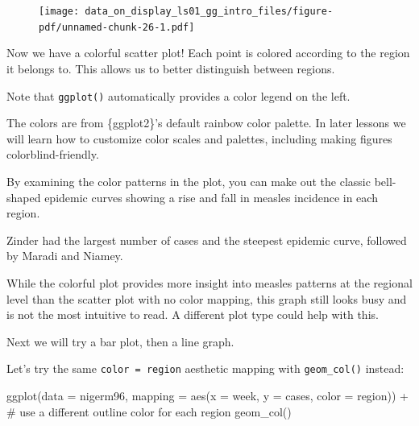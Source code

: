 \documentclass[
  letterpaper,
  DIV=11,
  numbers=noendperiod]{scrreprt}
\newenvironment{Shaded}{\begin{snugshade}}{\end{snugshade}}
\newcommand{\AttributeTok}[1]{\textcolor[rgb]{0.40,0.45,0.13}{#1}}
\newcommand{\CommentTok}[1]{\textcolor[rgb]{0.37,0.37,0.37}{#1}}
\newcommand{\FunctionTok}[1]{\textcolor[rgb]{0.28,0.35,0.67}{#1}}
\newcommand{\NormalTok}[1]{\textcolor[rgb]{0.00,0.23,0.31}{#1}}
\newcommand{\SpecialCharTok}[1]{\textcolor[rgb]{0.37,0.37,0.37}{#1}}
\begin{document}
\begin{figure}[H]

{\centering \texttt{[image: data\_on\_display\_ls01\_gg\_intro\_files/figure-pdf/unnamed-chunk-26-1.pdf]}

}

\end{figure}

Now we have a colorful scatter plot! Each point is colored according to
the region it belongs to. This allows us to better distinguish between
regions.

Note that \texttt{ggplot()} automatically provides a color legend on the
left.

\begin{tcolorbox}[enhanced jigsaw, colframe=quarto-callout-note-color-frame, rightrule=.15mm, opacityback=0, breakable, coltitle=black, colbacktitle=quarto-callout-note-color!10!white, bottomrule=.15mm, leftrule=.75mm, toprule=.15mm, arc=.35mm, bottomtitle=1mm, colback=white, left=2mm, opacitybacktitle=0.6, titlerule=0mm, title=\textcolor{quarto-callout-note-color}{\faInfo}\hspace{0.5em}{Side Note}, toptitle=1mm]

The colors are from \{ggplot2\}'s default rainbow color palette. In
later lessons we will learn how to customize color scales and palettes,
including making figures colorblind-friendly.

\end{tcolorbox}

By examining the color patterns in the plot, you can make out the
classic bell-shaped epidemic curves showing a rise and fall in measles
incidence in each region.

Zinder had the largest number of cases and the steepest epidemic curve,
followed by Maradi and Niamey.

While the colorful plot provides more insight into measles patterns at
the regional level than the scatter plot with no color mapping, this
graph still looks busy and is not the most intuitive to read. A
different plot type could help with this.

Next we will try a bar plot, then a line graph.

Let's try the same \texttt{color\ =\ region} aesthetic mapping with
\texttt{geom\_col()} instead:

\begin{Shaded}
\begin{Highlighting}[]
\FunctionTok{ggplot}\NormalTok{(}\AttributeTok{data =}\NormalTok{ nigerm96, }
       \AttributeTok{mapping =} \FunctionTok{aes}\NormalTok{(}\AttributeTok{x =}\NormalTok{ week, }
                     \AttributeTok{y =}\NormalTok{ cases, }
                     \AttributeTok{color =}\NormalTok{ region)) }\SpecialCharTok{+}  \CommentTok{\# use a different outline color for each region}
  \FunctionTok{geom\_col}\NormalTok{()}
\end{Highlighting}
\end{Shaded}
\end{document}
